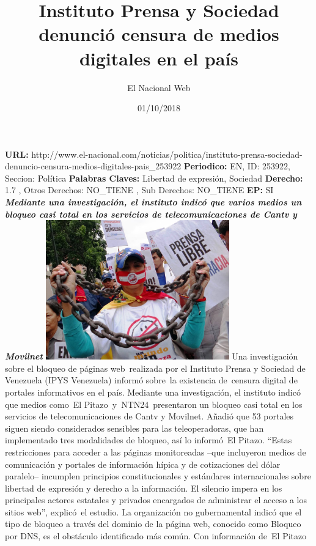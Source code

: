 \documentclass{article}%
\title{\textbf{Instituto Prensa y Sociedad denunció censura de medios digitales en el país}}%
\author{El Nacional Web}%
\date{01/10/2018}%
\begin{document}
%
\normalsize%
\maketitle%
\textbf{URL: }%
http://www.el{-}nacional.com/noticias/politica/instituto{-}prensa{-}sociedad{-}denuncio{-}censura{-}medios{-}digitales{-}pais\_253922\newline%
%
\textbf{Periodico: }%
EN, %
ID: %
253922, %
Seccion: %
Política\newline%
%
\textbf{Palabras Claves: }%
Libertad de expresión, Sociedad\newline%
%
\textbf{Derecho: }%
1.7%
, Otros Derechos: %
NO\_TIENE%
, Sub Derechos: %
NO\_TIENE%
\newline%
%
\textbf{EP: }%
SI\newline%
\newline%
%
\textbf{\textit{Mediante una investigación, el instituto indicó que varios medios un bloqueo casi total en los servicios de telecomunicaciones de Cantv y Movilnet}}%
\newline%
\newline%
%
\includegraphics[width=300px]{113.jpg}%
\newline%
%
Una investigación sobre el bloqueo de páginas web~realizada por el Instituto Prensa y Sociedad de Venezuela (IPYS Venezuela) informó sobre~la existencia de~censura digital de portales informativos en el país.%
\newline%
%
Mediante una investigación, el instituto indicó que medios como~El Pitazo~y~NTN24~presentaron un bloqueo casi total en los servicios de telecomunicaciones de Cantv y Movilnet. Añadió que 53 portales siguen siendo considerados sensibles para las teleoperadoras, que han implementado tres modalidades de bloqueo, así lo informó~El Pitazo.%
\newline%
%
“Estas restricciones para acceder a las páginas monitoreadas –que incluyeron medios de comunicación y portales de información hípica y de cotizaciones del dólar paralelo– incumplen principios constitucionales y estándares internacionales sobre libertad de expresión y derecho a la información. El silencio impera en los principales actores estatales y privados encargados de administrar el acceso a los sitios web”, explicó~el estudio.%
\newline%
%
La organización no gubernamental indicó que el tipo de bloqueo a través del dominio de la página web, conocido como Bloqueo por DNS, es el obstáculo identificado más común.%
\newline%
%
Con información de~El Pitazo%
\newline%
%
\end{document}
